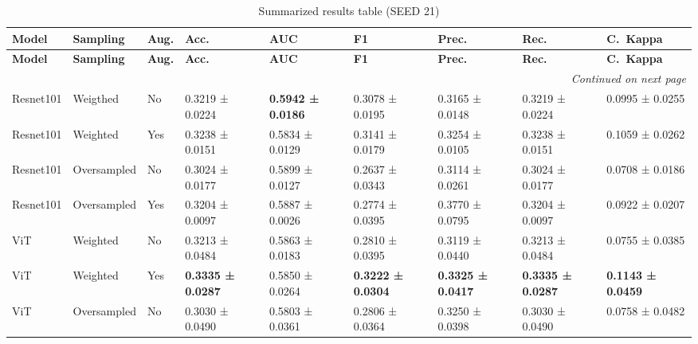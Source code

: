 \documentclass[a4paper,10pt]{book}
\begin{document}
\begin{scriptsize}
\begin{longtable}{@{}l l p{0.5cm} p{1.2cm} p{1.2cm} p{1.2cm} p{1.2cm} p{1.2cm} p{1.2cm}@{}}
\caption{Summarized results table (SEED 21)}\label{tab:avg_metrics_seed_21}\\
\toprule
\textbf{Model} & \textbf{Sampling} & \textbf{Aug.} &
\textbf{Acc.} & \textbf{AUC} & \textbf{F1} &
\textbf{Prec.} & \textbf{Rec.} & \textbf{C.\ Kappa}\\
\midrule
\endfirsthead

\toprule
\textbf{Model} & \textbf{Sampling} & \textbf{Aug.} &
\textbf{Acc.} & \textbf{AUC} & \textbf{F1} &
\textbf{Prec.} & \textbf{Rec.} & \textbf{C.\ Kappa}\\
\midrule
\endhead

\midrule
\multicolumn{9}{r}{\textit{Continued on next page}}\\
\midrule
\endfoot

\bottomrule
\endlastfoot
            Resnet101 & Weigthed & No & 0.3219 ± 0.0224 & \textbf{0.5942 ± 0.0186} & 0.3078 ± 0.0195 & 0.3165 ± 0.0148 & 0.3219 ± 0.0224 & 0.0995 ± 0.0255 \\ 
                        
        
            Resnet101 & Weighted & Yes & 0.3238 ± 0.0151 & 0.5834 ± 0.0129 & 0.3141 ± 0.0179 & 0.3254 ± 0.0105 & 0.3238 ± 0.0151 & 0.1059 ± 0.0262 \\ 
            
            
            Resnet101 & Oversampled & No & 0.3024 ± 0.0177 & 0.5899 ± 0.0127 & 0.2637 ± 0.0343 & 0.3114 ± 0.0261 & 0.3024 ± 0.0177 & 0.0708 ± 0.0186 \\ 
            Resnet101 & Oversampled & Yes & 0.3204 ± 0.0097 & 0.5887 ± 0.0026 & 0.2774 ± 0.0395 & 0.3770 ± 0.0795 & 0.3204 ± 0.0097 & 0.0922 ± 0.0207 \\ 
            
            ViT & Weighted & No & 0.3213 ± 0.0484 & 0.5863 ± 0.0183 & 0.2810 ± 0.0395 & 0.3119 ± 0.0440 & 0.3213 ± 0.0484 & 0.0755 ± 0.0385 \\ 
            
            
            ViT & Weighted & Yes & \textbf{0.3335 ± 0.0287} & 0.5850 ± 0.0264 & \textbf{0.3222 ± 0.0304} & \textbf{0.3325 ± 0.0417} & \textbf{0.3335 ± 0.0287} & \textbf{0.1143 ± 0.0459} \\ 
            
            
            ViT & Oversampled & No & 0.3030 ± 0.0490 & 0.5803 ± 0.0361 & 0.2806 ± 0.0364 & 0.3250 ± 0.0398 & 0.3030 ± 0.0490 & 0.0758 ± 0.0482 \\ 
            

\end{longtable}
\end{scriptsize}
\end{document}
